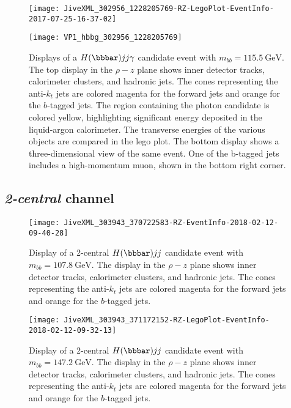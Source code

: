 \documentclass[PAPER, american,coverpage,texlive=2016, english]{\ATLASLATEXPATH atlasdoc}
\providecommand{\DIFadd}[1]{{\protect\color{blue}\uwave{#1}}} %
\providecommand{\DIFdel}[1]{{\protect\color{red}\sout{#1}}}                      %
\providecommand{\DIFaddFL}[1]{\DIFadd{#1}} %
\providecommand{\DIFdelFL}[1]{\DIFdel{#1}} %
\providecommand{\DIFaddbeginFL}{} %
\providecommand{\DIFaddendFL}{} %
\providecommand{\DIFdelbeginFL}{} %
\providecommand{\DIFdelendFL}{} %
\begin{document}
\begin{figure}[htbp]
\centering
\texttt{[image: JiveXML\_302956\_1228205769-RZ-LegoPlot-EventInfo-2017-07-25-16-37-02]}

\texttt{[image: VP1\_hbbg\_302956\_1228205769]}
\caption{Displays of a $H(\bbbar)jj\gamma$ candidate event with \DIFdelbeginFL \DIFdelFL{$m_{bb}=\SI{115.5}{\GeV}$}\DIFdelendFL \DIFaddbeginFL \DIFaddFL{$m_{bb}=\SI{116}{\GeV}$}\DIFaddendFL .  The top display in the $\rho-z$ plane shows inner detector tracks, calorimeter clusters, and hadronic jets.  The cones representing the anti-$k_t$ jets are colored magenta for the forward jets and orange for the $b$-tagged jets.  The region containing the photon candidate is colored yellow, highlighting significant energy deposited in the liquid-argon calorimeter.  The transverse energies of the various objects are compared in the lego plot. The bottom display shows a three-dimensional view of the same event.  One of the b-tagged jets includes a high-momentum muon, shown in the bottom right corner.}
\label{fig:event_displays_photon_125}
\end{figure}

\subsection{\textit{2-central} channel}

\begin{figure}[htbp]
\centering
\texttt{[image: JiveXML\_303943\_370722583-RZ-EventInfo-2018-02-12-09-40-28]}
\caption{Display of a 2-central $H(\bbbar)jj$ candidate event with \DIFdelbeginFL \DIFdelFL{$m_{bb}=\SI{107.8}{\GeV}$}\DIFdelendFL \DIFaddbeginFL \DIFaddFL{$m_{bb}=\SI{108}{\GeV}$}\DIFaddendFL .  
The display in the $\rho-z$ plane shows inner detector tracks, calorimeter clusters, and hadronic jets.
The cones representing the anti-$k_t$ jets are colored magenta for the forward jets and orange for the $b$-tagged jets.
}
\label{fig:event_display1_2central}
\end{figure}

\begin{figure}[htbp]
\centering
\texttt{[image: JiveXML\_303943\_371172152-RZ-LegoPlot-EventInfo-2018-02-12-09-32-13]}
\caption{Display of a 2-central $H(\bbbar)jj$ candidate event with \DIFdelbeginFL \DIFdelFL{$m_{bb}=\SI{147.2}{\GeV}$}\DIFdelendFL \DIFaddbeginFL \DIFaddFL{$m_{bb}=\SI{147}{\GeV}$}\DIFaddendFL .  
The display in the $\rho-z$ plane shows inner detector tracks, calorimeter clusters, and hadronic jets.  
The cones representing the anti-$k_t$ jets are colored magenta for the forward jets and orange for the $b$-tagged jets.
}
\label{fig:event_display2_2central}
\end{figure}
\end{document}
